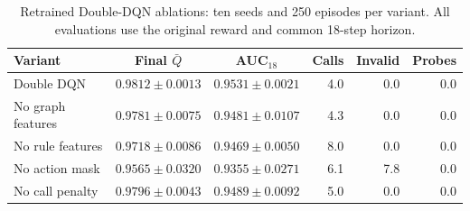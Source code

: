 \begin{table}[t]
\centering
\caption{Retrained Double-DQN ablations: ten seeds and 250 episodes per variant. All evaluations use the original reward and common 18-step horizon.}
\label{tab:offline_ablations}
\footnotesize
\setlength{\tabcolsep}{3pt}
\begin{tabular*}{\textwidth}{@{\extracolsep{\fill}}lccrrr@{}}
\toprule
Variant & Final $\bar Q$ & AUC$_{18}$ & Calls & Invalid & Probes \\
\midrule
Double DQN & $0.9812\pm0.0013$ & $0.9531\pm0.0021$ & 4.0 & 0.0 & 0.0 \\
No graph features & $0.9781\pm0.0075$ & $0.9481\pm0.0107$ & 4.3 & 0.0 & 0.0 \\
No rule features & $0.9718\pm0.0086$ & $0.9469\pm0.0050$ & 8.0 & 0.0 & 0.0 \\
No action mask & $0.9565\pm0.0320$ & $0.9355\pm0.0271$ & 6.1 & 7.8 & 0.0 \\
No call penalty & $0.9796\pm0.0043$ & $0.9489\pm0.0092$ & 5.0 & 0.0 & 0.0 \\
\bottomrule
\end{tabular*}
\end{table}
